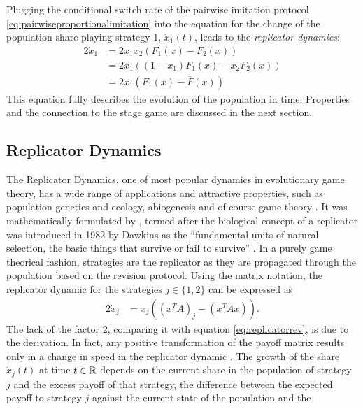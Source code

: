 Plugging the conditional switch rate of the pairwise imitation protocol 
\eqref{eq:pairwiseproportionalimitation} into the equation for the change 
of the population share playing strategy 1, $\dot{x}_1(t)$, leads to the 
\textit{replicator dynamics}:
\begin{alignat}{2}
        \label{eq:replicatorrev} 
        \dot{x}_1 &= 2 x_1 x_2 (F_1(x) - F_2(x)) \\
                  &= 2 x_1 ((1-x_1) F_1(x) - x_2 F_2(x)) \\
                  &= 2 x_1 (F_1(x) - \bar{F}(x)) 
\end{alignat}
This equation fully describes the evolution of the population in time.
Properties and the connection to the stage game are discussed in the next
section.

\subsection{Replicator Dynamics}
\label{sec:replicatordynamic}
The Replicator Dynamics, one of most popular dynamics in 
evolutionary game theory, has a wide range of applications and 
attractive properties, such as population genetics and ecology, abiogenesis and
of course game theory \parencite[203]{hofbauer_evolutionary_1998}. 
It was mathematically formulated by \textcite{taylor_evolutionary_1978}, 
termed after the biological concept of a replicator was 
introduced in 1982 by Dawkins as the ``fundamental units of natural selection,
the basic things that survive or fail to survive''
\parencite[254]{dawkin_selfish_2016}. In a purely game theorical fashion,
strategies are the replicator as they are propagated through the population
based on the revision protocol.
Using the matrix notation, the replicator dynamic  
for the strategies $j \in \{1,2\}$ can be expressed as
\begin{alignat}{2}
        \dot{x}_j &= x_j\left(\left(x^T A\right)_j -
                \left(x^T A x\right)\right). 
        \label{eq:replicator}
\end{alignat}
The lack of the factor $2$, comparing it with equation 
\eqref{eq:replicatorrev}, is due to the derivation. In fact, any
positive transformation of the payoff matrix 
results only in a change in speed in the replicator dynamic
\parencite[73]{weibull_evolutionary_1997}.
The growth of the share $\dot{x}_j(t)$ at time $t \in \mathbb{R}$ depends 
on the current share in the population of strategy $j$ and the 
excess payoff of that strategy, the difference between the expected 
payoff to strategy $j$ against the current state of the population and the
